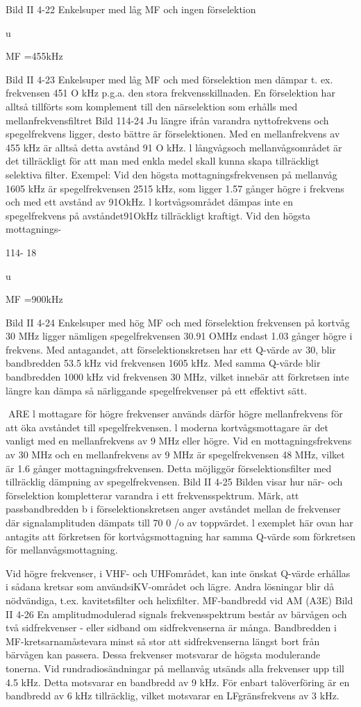 \documentclass[a4paper,twoside,twocolumn,openright]{book}
\begin{document}
{{{Bild II 4-22 Enkelsuper med låg MF och ingen förselektion

u

MF =455kHz

Bild II 4-23 Enkelsuper med låg MF och med förselektion
men dämpar t. ex. frekvensen 451 O
kHz p.g.a. den stora frekvensskillnaden. En förselektion har alltså tillförts
som komplement till den närselektion
som erhålls med mellanfrekvensfiltret
Bild 114-24
Ju längre ifrån varandra nyttofrekvens och spegelfrekvens ligger,
desto bättre är förselektionen. Med en
mellanfrekvens av 455 kHz är alltså
detta avstånd 91 O kHz. l långvågsoch mellanvågsområdet är det tillräckligt för att man med enkla medel skall
kunna skapa tillräckligt selektiva filter.
Exempel:
Vid den högsta mottagningsfrekvensen på mellanvåg 1605 kHz är
spegelfrekvensen 2515 kHz, som ligger 1.57 gånger högre i frekvens och
med ett avstånd av 91OkHz. l kortvågsområdet dämpas inte en spegelfrekvens på avståndet91OkHz tillräckligt
kraftigt. Vid den högsta mottagnings-

114- 18

u

MF =900kHz

Bild II 4-24 Enkelsuper med hög MF och
med förselektion
frekvensen på kortvåg 30 MHz ligger nämligen
spegelfrekvensen 30.91 OMHz endast 1.03 gånger
högre i frekvens. Med antagandet, att förselektionskretsen har ett Q-värde av 30, blir bandbredden 53.5 kHz vid frekvensen 1605 kHz.
Med samma Q-värde blir bandbredden 1000
kHz vid frekvensen 30 MHz, vilket innebär att
förkretsen inte längre kan dämpa så närliggande
spegelfrekvenser på ett effektivt sätt.

ARE
l mottagare för högre frekvenser används
därför högre mellanfrekvens för att öka avståndet till spegelfrekvensen. l moderna
kortvågsmottagare är det vanligt med en
mellanfrekvens av 9 MHz eller högre. Vid en
mottagningsfrekvens av 30 MHz och en
mellanfrekvens av 9 MHz är spegelfrekvensen 48 MHz, vilket är 1.6 gånger mottagningsfrekvensen. Detta möjliggör förselektionsfilter med tillräcklig dämpning av spegelfrekvensen.
Bild II 4-25
Bilden visar hur när- och förselektion kompletterar varandra i ett frekvensspektrum.
Märk, att passbandbredden b i förselektionskretsen anger avståndet mellan de frekvenser där signalamplituden dämpats till 70
0
/o av toppvärdet. l exemplet här ovan har
antagits att förkretsen för kortvågsmottagning har samma Q-värde som förkretsen för
mellanvågsmottagning.

Vid högre frekvenser, i VHF- och UHFområdet, kan inte önskat Q-värde erhållas i
sådana kretsar som användsiKV-området
och lägre. Andra lösningar blir då nödvändiga, t.ex. kavitetsfilter och helixfilter.
MF-bandbredd vid AM (A3E)
Bild II 4-26
En amplitudmodulerad signals frekvensspektrum består av bärvågen och två sidfrekvenser - eller sidband om sidfrekvenserna är många.
Bandbredden i MF-kretsarnamåstevara
minst så stor att sidfrekvenserna längst bort
från bärvågen kan passera. Dessa frekvenser motsvarar de högsta modulerande tonerna. Vid rundradiosändningar på mellanvåg utsänds alla frekvenser upp till 4.5 kHz.
Detta motsvarar en bandbredd av 9 kHz.
För enbart talöverföring är en bandbredd av
6 kHz tillräcklig, vilket motsvarar en LFgränsfrekvens av 3 kHz.

}}}
\end{document}
